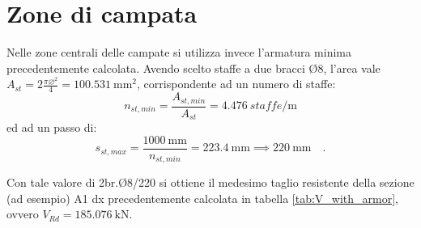 \section{Zone di campata}
Nelle zone centrali delle campate si utilizza invece l'armatura minima precedentemente calcolata.
Avendo scelto staffe a due bracci Ø8, l'area vale $A_{st} = 2 \frac{\pi \varnothing^2}{4} = \SI{100.531}{\milli\metre\squared}$, corrispondente ad un numero di staffe:
\[
    n_{st, min} = \frac{A_{st, min}}{A_{st}} = \SI{4.476}{staffe\per\metre}    
\]
ed ad un passo di:
\[
    s_{st, max} = \frac{\SI{1000}{\milli\metre}}{n_{st,min}} = \SI{223.4}{\milli\metre} \implies \SI{220}{\milli\metre}  \quad .
\]

Con tale valore di 2br.Ø8/220 si ottiene il medesimo taglio resistente della sezione (ad esempio) A1 dx precedentemente calcolata in tabella \ref{tab:V_with_armor}, ovvero $V_{Rd} = \SI{185.076}{\kilo\newton}$.

